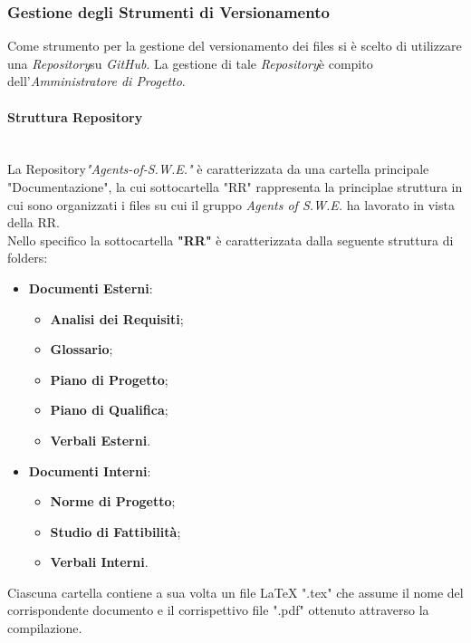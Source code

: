 \subsubsection{Gestione degli Strumenti di Versionamento}
	Come strumento per la gestione del versionamento dei files si è scelto di utilizzare una \textit{Repository}\glossario su \textit{GitHub}\glossario. La gestione di tale \textit{Repository}\glossario è compito dell'\textit{Amministratore di Progetto}.

\paragraph{Struttura Repository} ~\\
	La Repository\glossario \textit{"Agents-of-S.W.E."} è caratterizzata da una cartella principale "Documentazione", la cui sottocartella "RR" rappresenta la principlae struttura in cui sono organizzati i files su cui il gruppo \textit{Agents of S.W.E.} ha lavorato in vista della RR.\\
	Nello specifico la sottocartella \textbf{"RR"} è caratterizzata dalla seguente struttura di folders:
	\begin{itemize}
	\item \textbf{Documenti Esterni}:
		\begin{itemize}
		\item \textbf{Analisi dei Requisiti};
		\item \textbf{Glossario};
		\item \textbf{Piano di Progetto};
		\item \textbf{Piano di Qualifica};
		\item \textbf{Verbali Esterni}.
		\end{itemize}
	\item \textbf{Documenti Interni}:
		\begin{itemize}
		\item \textbf{Norme di Progetto};
		\item \textbf{Studio di Fattibilità};
		\item \textbf{Verbali Interni}.
		\end{itemize}
	\end{itemize}
	Ciascuna cartella contiene a sua volta un file LaTeX ".tex" che assume il nome del corrispondente documento e il corrispettivo file ".pdf" ottenuto attraverso la compilazione.

